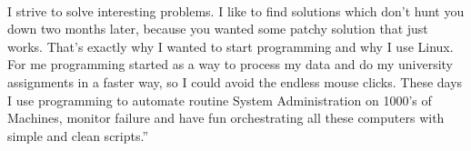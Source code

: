 \documentclass[a4papper,overlapped,line]{res}
\newenvironment{changemargin}[2]{\begin{list}{}{
\setlength{\topsep}{0pt}\setlength{\leftmargin}{0pt}
 \setlength{\rightmargin}{0pt}
 \setlength{\listparindent}{\parindent}
 \setlength{\itemindent}{\parindent}
 \setlength{\parsep}{0pt plus 1pt}
 \addtolength{\leftmargin}{#1}\addtolength{\rightmargin}{#2}
 }\item }{\end{list}}
\begin{document}
\begin{resume}


\begin{changemargin}{-0.7cm}{-2.3cm}
{\setlength{\fboxsep}{18pt}
\colorbox{blue!20}{
\begin{minipage}{0.95\textwidth}

\rmfamily
\begin{flushleft}
\\
\vspace{-0.65cm}
\begin{small}
I strive to solve interesting problems. I like to find solutions which don't hunt you down two months later, 
because you wanted some patchy solution that just works. That's exactly why I 
wanted to start programming and why I use Linux. For me programming started as a way to process my data and
do my university assignments in a faster way, so I could avoid the endless mouse clicks.
These days I use programming to automate routine System Administration on 1000's of Machines, monitor failure
and have fun orchestrating all these computers with simple and clean scripts.\textquotedblright
\end{small}\end{flushleft}
\end{minipage}
}
}
\end{changemargin}

\vspace*{-2.5mm}
\vspace{0.50cm}

\setlength\parindent{0pt}


\end{resume}
\end{document}
